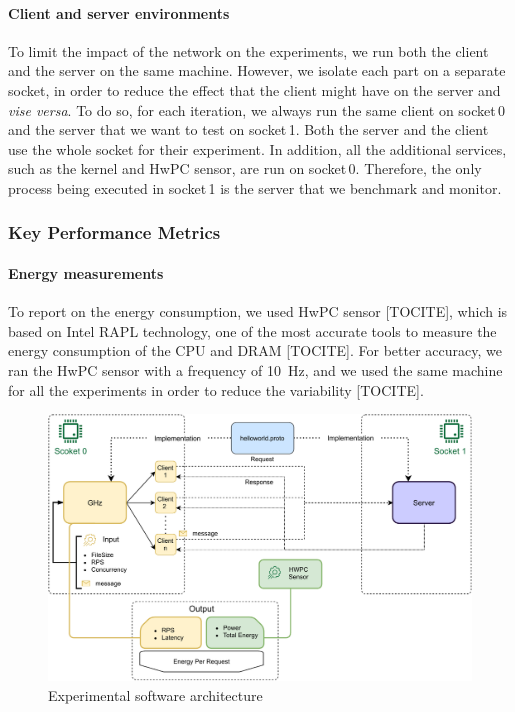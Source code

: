 \paragraph{Client and server environments}
To limit the impact of the network on the experiments, we run both the client and the server on the same machine.
However, we isolate each part on a separate socket, in order to reduce the effect that the client might have on the server and \emph{vise versa}.
To do so, for each iteration, we always run the same client on \textsf{socket\,0} and the server that we want to test on \textsf{socket\,1}.
Both the server and the client use the whole socket for their experiment.
In addition, all the additional services, such as the kernel and HwPC sensor, are run on \textsf{socket\,0}.
Therefore, the only process being executed in \textsf{socket\,1} is the server that we benchmark and monitor.

\subsubsection{Key Performance Metrics}
\paragraph{Energy measurements}
To report on the energy consumption, we used HwPC sensor [TOCITE], which is based on Intel RAPL technology, one of the most accurate tools to measure the energy consumption of the CPU and DRAM [TOCITE].
For better accuracy, we ran the HwPC sensor with a frequency of 10~Hz, and we used the same machine for all the experiments in order to reduce the variability [TOCITE].

\begin{figure}[!hbt]
    \begin{center}
        \includegraphics[width=.8\linewidth]{imgs/rpcprotocol}
    \end{center}
    \caption{Experimental software architecture}\label{fig:rpcprotocol}
\end{figure}


